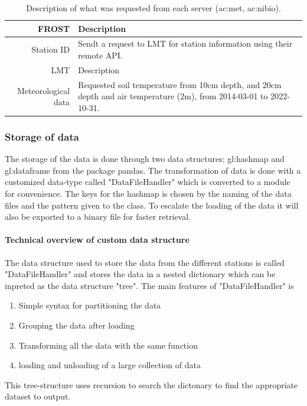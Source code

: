 \begin{table}
	\centering
	\begin{tabular}{r|p{5cm}|}
		FROST & Description\\ \hline
		Station ID & Sendt a request to LMT for station information using their remote API.\\
		 \hline LMT & Description\\ \hline
		Meteorological data & Requested soil temperature from 10cm depth, and 20cm depth and air temperature (2m), from 2014-03-01 to 2022-10-31.
	\end{tabular}
	\caption[Request to servers about stations]{Description of what was requested from each server (\acrshort{ac:met}, \acrshort{ac:nibio}).}
	\label{tab:station_request}
\end{table}

\subsubsection{Storage of data}
The storage of the data is done through two data structures; \gls{gl:hashmap} and \gls{gl:dataframe} from the package pandas. The transformation of data is done with a customized data-type called "DataFileHandler" which is converted to a module for convenience. The keys for the hashmap is chosen by the naming of the data files and the pattern given to the class. To escalate the loading of the data it will also be exported to a binary file for faster retrieval. 

\paragraph[Data structure]{Technical overview of custom data structure}
The data structure used to store the data from the different stations is called "DataFileHandler" and stores the data in a nested dictionary which can be inpreted as the data structure "tree". The main features of "DataFileHandler" is 
\begin{enumerate}
	\item Simple syntax for partitioning the data
	\item Grouping the data after loading
	\item Transforming all the data with the same function
	\item loading and unloading of a large collection of data
\end{enumerate}

This tree-structure uses recursion to search the dictonary to find the appropriate dataset to output. 


